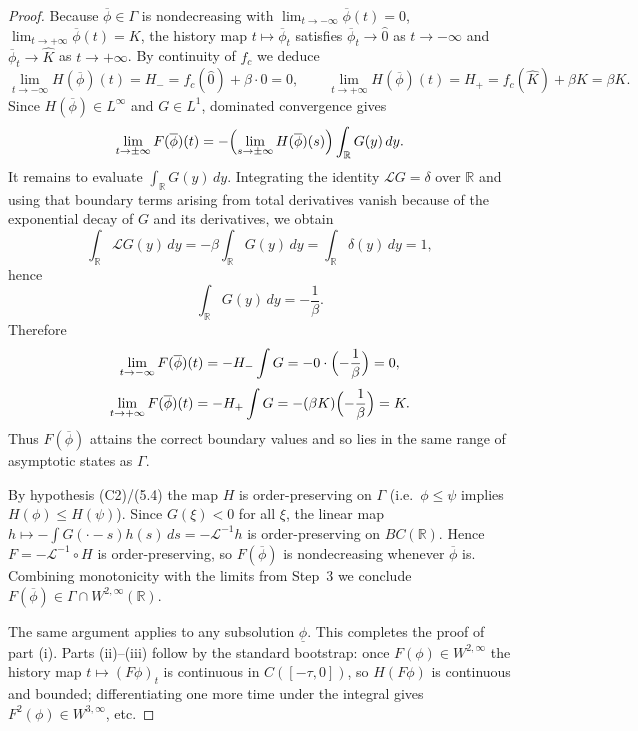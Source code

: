 \documentclass[12pt,letterpaper]{amsart}
\theoremstyle{definition}
\theoremstyle{remark}
\numberwithin{equation}{section}
\begin{document}
\begin{proof}
 	Because $\overline\phi\in\Gamma$ is nondecreasing with
 	$\lim_{t\to-\infty}\overline\phi(t)=0$, $\lim_{t\to+\infty}\overline\phi(t)=K$,
 	the history map $t\mapsto\overline\phi_t$ satisfies $\overline\phi_t\to\hat 0$ as $t\to-\infty$
 	and $\overline\phi_t\to\hat K$ as $t\to+\infty$. By continuity of $f_c$ we deduce
 	\[
 	\lim_{t\to-\infty} H(\overline\phi)(t)=H_-=f_c(\hat 0)+\beta\cdot 0=0,
 	\qquad
 	\lim_{t\to+\infty} H(\overline\phi)(t)=H_+=f_c(\hat K)+\beta K=\beta K.
 	\]
 	Since $H(\overline\phi)\in L^\infty$ and $G\in L^1$, dominated convergence gives
 	\[
 	\lim_{t\to\pm\infty} F(\overline\phi)(t)
 	= -\Bigl(\lim_{s\to\pm\infty} H(\overline\phi)(s)\Bigr)\int_{\mathbb R} G(y)\,dy.
 	\]
 	It remains to evaluate $\int_{\mathbb R}G(y)\,dy$. Integrating the identity
 	$\mathcal L G=\delta$ over $\mathbb R$ and using that boundary terms arising from total
 	derivatives vanish because of the exponential decay of $G$ and its derivatives, we obtain
 	\[
 	\int_{\mathbb R} \mathcal L G(y)\,dy = -\beta\int_{\mathbb R} G(y)\,dy = \int_{\mathbb R}\delta(y)\,dy = 1,
 	\]
 	hence
 	\[
 	\int_{\mathbb R} G(y)\,dy = -\frac{1}{\beta}.
 	\]
 	Therefore
 	\[
 	\lim_{t\to-\infty} F(\overline\phi)(t) = -H_- \int G = -0\cdot\Bigl(-\frac{1}{\beta}\Bigr)=0,
 	\]
 	\[
 	\lim_{t\to+\infty} F(\overline\phi)(t) = -H_+ \int G
 	= -(\beta K)\Bigl(-\frac{1}{\beta}\Bigr) = K.
 	\]
 	Thus $F(\overline\phi)$ attains the correct boundary values and so lies in the same
 	range of asymptotic states as $\Gamma$.
 	
 	By hypothesis (C2)/(5.4) the map $H$ is order-preserving on $\Gamma$ (i.e.\ \(\phi\le\psi\)
 	implies \(H(\phi)\le H(\psi)\)). Since $G(\xi)<0$ for all $\xi$, the linear map
 	$h\mapsto -\int G(\cdot-s)h(s)\,ds=-\mathcal L^{-1}h$ is order-preserving on $BC(\mathbb R)$.
 	Hence $F=-\mathcal L^{-1}\circ H$ is order-preserving, so $F(\overline\phi)$ is nondecreasing
 	whenever $\overline\phi$ is. Combining monotonicity with the limits from Step~3 we conclude
 	$F(\overline\phi)\in\Gamma\cap W^{2,\infty}(\mathbb R)$.
 	
 	\medskip
 	The same argument applies to any subsolution $\underline\phi$. This completes the proof of part (i).
 	Parts (ii)--(iii) follow by the standard bootstrap: once $F(\phi)\in W^{2,\infty}$ the history
 	map $t\mapsto (F\phi)_t$ is continuous in $C([-\tau,0])$, so $H(F\phi)$ is continuous and bounded;
 	differentiating one more time under the integral gives $F^2(\phi)\in W^{3,\infty}$, etc.
 \end{proof}
  
\end{document}
